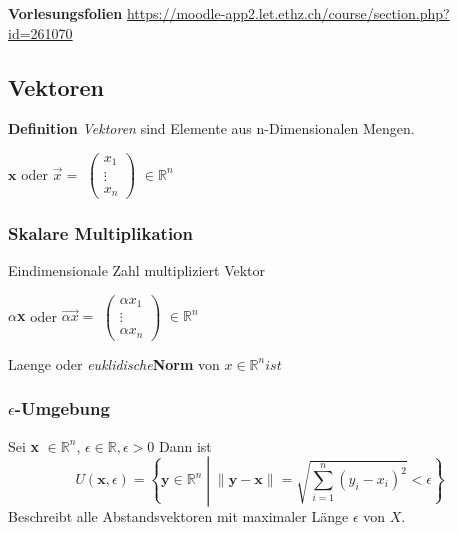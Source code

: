 
\textbf{Vorlesungsfolien} \url{https://moodle-app2.let.ethz.ch/course/section.php?id=261070}

\subsection{Vektoren}
\textbf{Definition} \textit{Vektoren} sind Elemente aus n-Dimensionalen Mengen.
\begin{theorem}
    $\textbf{x}$ oder $ \vec{x} = $
    $\begin{pmatrix}
        x_1 \\
        \vdots\\ 
        x_n
    \end{pmatrix}$
    $\in \mathbb{R}^n$
\end{theorem}

\subsubsection{Skalare Multiplikation}

Eindimensionale Zahl multipliziert Vektor 

\begin{theorem}
    \textbf{$\alpha$x} oder  $\vec{\alpha x} = $
    $\begin{pmatrix}
       \alpha x_1 \\
        \vdots\\ 
       \alpha x_n
    \end{pmatrix}$
    $\in \mathbb{R}^n$
\end{theorem}

Laenge oder \textit{euklidische}\textbf{Norm} von $x \in \mathbb{R}^n ist$
\pagebreak

\subsubsection{$\epsilon$-Umgebung}

\begin{theorem}
    Sei \textbf{x}  $\in \mathbb{R}^n$, $\epsilon \in \mathbb{R}, \epsilon > 0$ Dann ist 
    \begin{equation}
        U(\textbf{x}, \epsilon) = \left\{\textbf{y} \in \mathbb{R}^n \middle| \lVert\textbf{y}-\textbf{x}\rVert = \sqrt{\sum_{i=1}^{n} (y_i - x_i)^2} < \epsilon\right\}
   \end{equation}   
   Beschreibt alle Abstandsvektoren mit maximaler Länge $\epsilon$ von $X$. 
\end{theorem}

